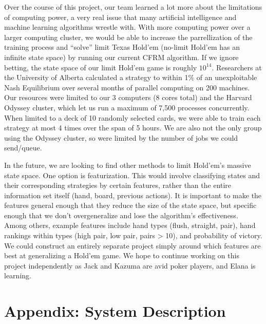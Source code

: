 \documentclass[11pt]{article}
\begin{document}
Over the course of this project, our team learned a lot more about the limitations of computing power, a very real issue that many artificial intelligence and machine learning algorithms wrestle with. With more computing power over a larger computing cluster, we would be able to increase the parrellization of the training process and ``solve'' limit Texas Hold'em (no-limit Hold'em has an infinite state space) by running our current CFRM algorithm. If we ignore betting, the state space of our limit Hold'em game is roughly $10^14$. Researchers at the University of Alberta calculated a strategy to within 1\% of an unexploitable Nash Equilibrium over several months of parallel computing on 200 machines\cite{pokernews}. Our resources were limited to our 3 computers (8 cores total) and the Harvard Odyssey cluster, which let us run a maximum of 7,500 processes concurrently. When limited to a deck of 10 randomly selected cards, we were able to train each strategy at most 4 times over the span of 5 hours. We are also not the only group using the Odyssey cluster, so were limited by the number of jobs we could send/queue.

In the future, we are looking to find other methods to limit Hold'em's massive state space. One option is featurization. This would involve classifying states and their corresponding strategies by certain features, rather than the entire information set itself (hand, board, previous actions). It is important to make the features general enough that they reduce the size of the state space, but specific enough that we don't overgeneralize and lose the algorithm's effectiveness. Among others, example features include hand types (flush, straight, pair), hand rankings within types (high pair, low pair, pairs > 10), and probability of victory. We could construct an entirely separate project simply around which features are best at generalizing a Hold'em game. We hope to continue working on this project independently as Jack and Kazuma are avid poker players, and Elana is learning.

\newpage
\appendix

\section{Appendix: System Description}
\end{document}
